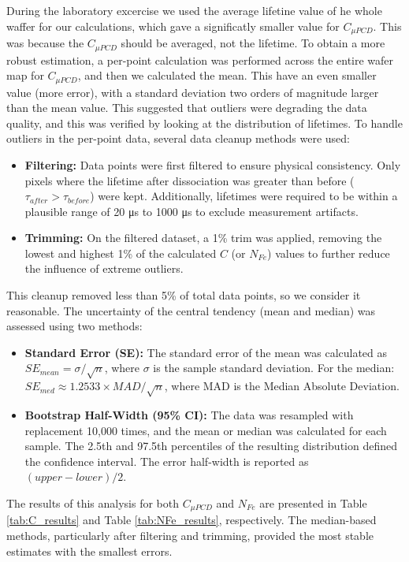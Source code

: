 \documentclass[12pt,a4paper]{article}
\begin{document}
During the laboratory excercise we used the average lifetine value of he whole waffer for our calculations, which gave a significatly smaller value for $C_{\mu PCD}$. This was because the $C_{\mu PCD}$ should be averaged, not the lifetime. To obtain a more robust estimation, a per-point calculation was performed across the entire wafer map for $C_{\mu PCD}$, and then we calculated the mean. This have an even smaller value (more error), with a standard deviation two orders of magnitude larger than the mean value. This suggested that outliers were degrading the data quality, and this was verified by looking at the distribution of lifetimes. To handle outliers in the per-point data, several data cleanup methods were used:
\begin{itemize}
    \item \textbf{Filtering:} Data points were first filtered to ensure physical consistency. Only pixels where the lifetime after dissociation was greater than before ($\tau_{after} > \tau_{before}$) were kept. Additionally, lifetimes were required to be within a plausible range of 20 \si{\micro\second} to 1000 \si{\micro\second} to exclude measurement artifacts.
    \item \textbf{Trimming:} On the filtered dataset, a 1\% trim was applied, removing the lowest and highest 1\% of the calculated $C$ (or $N_{Fe}$) values to further reduce the influence of extreme outliers.
\end{itemize}

This cleanup removed less than 5\% of total data points, so we consider it reasonable. The uncertainty of the central tendency (mean and median) was assessed using two methods:
\begin{itemize}
    \item \textbf{Standard Error (SE):} The standard error of the mean was calculated as $SE_{mean} = \sigma / \sqrt{n}$, where $\sigma$ is the sample standard deviation. For the median: $SE_{med} \approx 1.2533 \times MAD / \sqrt{n}$, where MAD is the Median Absolute Deviation.
    \item \textbf{Bootstrap Half-Width (95\% CI):} The data was resampled with replacement 10,000 times, and the mean or median was calculated for each sample. The 2.5th and 97.5th percentiles of the resulting distribution defined the confidence interval. The error half-width is reported as $(upper - lower)/2$.
\end{itemize}

The results of this analysis for both $C_{\mu PCD}$ and $N_{Fe}$ are presented in Table \ref{tab:C_results} and Table \ref{tab:NFe_results}, respectively. The median-based methods, particularly after filtering and trimming, provided the most stable estimates with the smallest errors.
\end{document}
